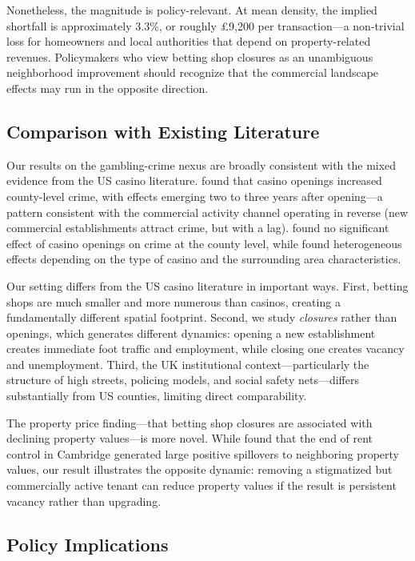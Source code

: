 \documentclass[12pt]{article}
\begin{document}
Nonetheless, the magnitude is policy-relevant. At mean density, the implied shortfall is approximately 3.3\%, or roughly \pounds9,200 per transaction---a non-trivial loss for homeowners and local authorities that depend on property-related revenues. Policymakers who view betting shop closures as an unambiguous neighborhood improvement should recognize that the commercial landscape effects may run in the opposite direction.

\subsection{Comparison with Existing Literature}

Our results on the gambling-crime nexus are broadly consistent with the mixed evidence from the US casino literature. \citet{grinols2004} found that casino openings increased county-level crime, with effects emerging two to three years after opening---a pattern consistent with the commercial activity channel operating in reverse (new commercial establishments attract crime, but with a lag). \citet{evans2009} found no significant effect of casino openings on crime at the county level, while \citet{humphreys2010} found heterogeneous effects depending on the type of casino and the surrounding area characteristics.

Our setting differs from the US casino literature in important ways. First, betting shops are much smaller and more numerous than casinos, creating a fundamentally different spatial footprint. Second, we study \textit{closures} rather than openings, which generates different dynamics: opening a new establishment creates immediate foot traffic and employment, while closing one creates vacancy and unemployment. Third, the UK institutional context---particularly the structure of high streets, policing models, and social safety nets---differs substantially from US counties, limiting direct comparability.

The property price finding---that betting shop closures are associated with declining property values---is more novel. While \citet{autor2014} found that the end of rent control in Cambridge generated large positive spillovers to neighboring property values, our result illustrates the opposite dynamic: removing a stigmatized but commercially active tenant can reduce property values if the result is persistent vacancy rather than upgrading.

\subsection{Policy Implications}
\end{document}
